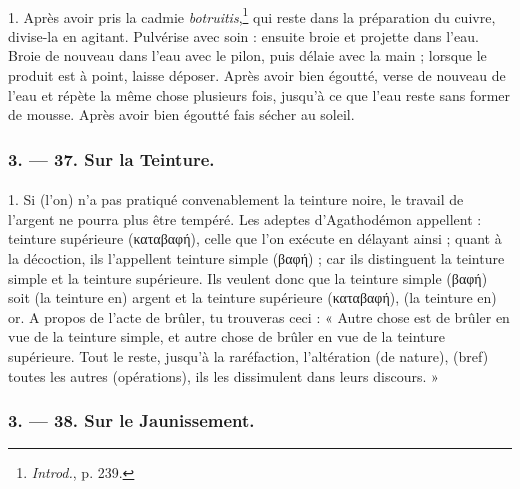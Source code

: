 \documentclass[a4paper, 11pt, oneside, polutonikogreek, french]{article}
\begin{document}
\paragraph{}
1. Après avoir pris la cadmie \emph{botruitis},\footnote{\emph{Introd.}, p. 239.} qui reste dans la préparation du cuivre, divise-la en agitant. Pulvérise avec soin : ensuite broie et projette dans l'eau. Broie de nouveau dans l'eau avec le pilon, puis délaie avec la main ; lorsque le produit est à point, laisse déposer. Après avoir bien égoutté, verse de nouveau de l'eau et répète la même chose plusieurs fois, jusqu'à ce que l'eau reste sans former de mousse. Après avoir bien égoutté fais sécher au soleil.

\bigskip
\centerline{\EightStarTaper}
\centerline{\EightStarTaper\EightStarTaper}
\bigskip

\subsubsection{3. --- 37. Sur la Teinture.}
\paragraph{}
1. Si (l'on) n'a pas pratiqué convenablement la teinture noire, le travail de l'argent ne pourra plus être tempéré. Les adeptes d'Agathodémon appellent : teinture supérieure (καταβαφή), celle que l'on exécute en délayant ainsi ; quant à la décoction, ils l'appellent teinture simple (βαφή) ; car ils distinguent la teinture simple et la teinture supérieure. Ils veulent donc que la teinture simple (βαφή) soit (la teinture en) argent et la teinture supérieure (καταβαφή), (la teinture en) or. A propos de l'acte de brûler, tu trouveras ceci : « Autre chose est de brûler en vue de la teinture simple, et autre chose de brûler en vue de la teinture supérieure. Tout le reste, jusqu'à la raréfaction, l'altération (de nature), (bref) toutes les autres (opérations), ils les dissimulent dans leurs discours. »

\bigskip
\centerline{\EightStarTaper}
\centerline{\EightStarTaper\EightStarTaper}
\bigskip

\subsubsection{3. --- 38. Sur le Jaunissement.}
\end{document}

